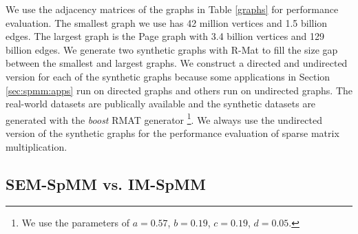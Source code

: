 We use the adjacency matrices of the graphs in Table \ref{graphs} for performance
evaluation. The smallest graph we use has 42 million vertices and 1.5 billion
edges. The largest graph is the Page graph with 3.4 billion vertices and 129
billion edges. We generate two synthetic graphs with R-Mat \cite{rmat} to fill
the size gap between the smallest and largest graphs. We construct a directed and
undirected version for each of the synthetic graphs because some applications
in Section \ref{sec:spmm:apps} run on directed graphs and others run on undirected
graphs. The real-world datasets are publically available and the synthetic
datasets are generated with the \textit{boost} RMAT generator
\footnote{We use the parameters of $a=0.57$, $b=0.19$, $c=0.19$,
$d=0.05$.}. We always use the undirected version of the synthetic graphs for
the performance evaluation of sparse matrix multiplication.

\subsection{SEM-SpMM vs. IM-SpMM}

